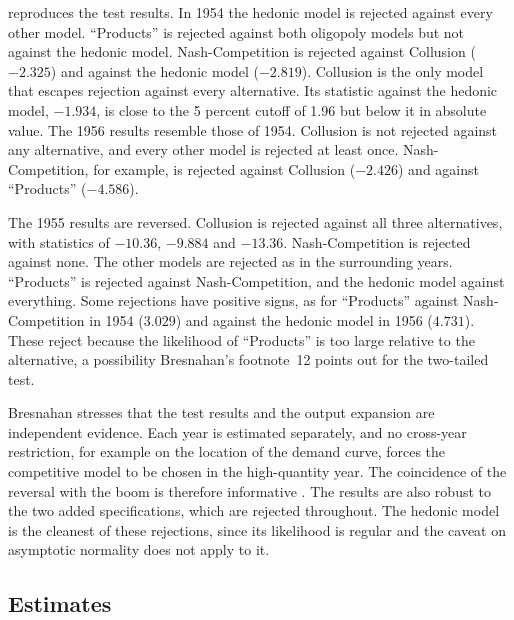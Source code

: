  reproduces the test results. In 1954 the hedonic model is rejected against every other
model. ``Products'' is rejected against both oligopoly models but not against the hedonic model.
Nash-Competition is rejected against Collusion ($-2.325$) and against the hedonic model ($-2.819$). Collusion is the
only model that escapes rejection against every alternative. Its statistic against the hedonic model, $-1.934$, is
close to the 5 percent cutoff of 1.96 but below it in absolute value. The 1956 results resemble those of 1954. Collusion is not
rejected against any alternative, and every other model is rejected at least once. Nash-Competition, for example,
is rejected against Collusion ($-2.426$) and against ``Products'' ($-4.586$).

The 1955 results are reversed. Collusion is rejected against all three alternatives, with statistics of $-10.36$,
$-9.884$ and $-13.36$. Nash-Competition is rejected against none. The other models are rejected as in the
surrounding years. ``Products'' is rejected against Nash-Competition, and the hedonic model against everything.
Some rejections have positive signs, as for ``Products'' against Nash-Competition in 1954 ($3.029$) and against the
hedonic model in 1956 ($4.731$). These reject because the likelihood of ``Products'' is too large relative to the
alternative, a possibility Bresnahan's footnote~12 points out for the two-tailed test.

Bresnahan stresses that the test results and the output expansion are independent evidence. Each year is estimated
separately, and no cross-year restriction, for example on the location of the demand curve, forces the competitive
model to be chosen in the high-quantity year. The coincidence of the reversal with the boom is therefore
informative \citep[p.~472]{Bresnahan1987}. The results are also robust to the two added specifications, which are
rejected throughout. The hedonic model is the cleanest of these rejections, since its likelihood is regular and the
caveat on asymptotic normality does not apply to it.

\subsection{Estimates}\label{sec:06-bres-estimates}

